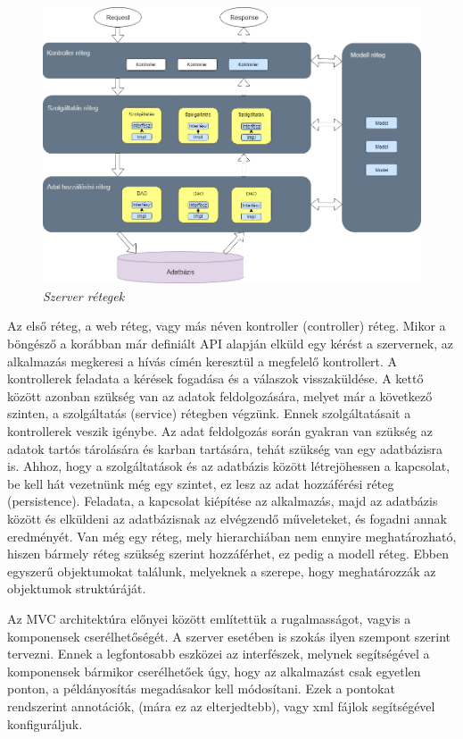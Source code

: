 \begin{figure}[!h]
	\centering
	\includegraphics[width=0.9\linewidth]{kepek/server-layers-colored.png}
	\caption{\textit{Szerver rétegek}}
	\label{fig:server-layers}
\end{figure}

Az első réteg, a web réteg, vagy más néven kontroller (controller) réteg. Mikor a böngésző a korábban már definiált API alapján elküld egy kérést a szervernek, az alkalmazás megkeresi a hívás címén keresztül a megfelelő kontrollert. A kontrollerek feladata a kérések fogadása és a válaszok visszaküldése.  A kettő között azonban szükség van az adatok feldolgozására, melyet már a következő szinten, a szolgáltatás (service) rétegben végzünk. Ennek szolgáltatásait a kontrollerek veszik igénybe. Az adat feldolgozás során gyakran van szükség az adatok tartós tárolására és karban tartására, tehát szükség van egy adatbázisra is. Ahhoz, hogy a szolgáltatások és az adatbázis között létrejöhessen a kapcsolat, be kell hát vezetnünk még egy szintet, ez lesz az adat hozzáférési réteg (persistence). Feladata, a kapcsolat kiépítése az alkalmazás, majd az adatbázis között és elküldeni az adatbázisnak az elvégzendő műveleteket, és fogadni annak eredményét. Van még egy réteg, mely hierarchiában nem ennyire meghatározható, hiszen bármely réteg szükség szerint hozzáférhet, ez pedig a modell réteg. Ebben egyszerű objektumokat találunk, melyeknek a szerepe, hogy meghatározzák az objektumok struktúráját.

Az MVC architektúra előnyei között említettük a rugalmasságot, vagyis a komponensek cserélhetőségét. A szerver esetében is szokás ilyen szempont szerint tervezni. Ennek a legfontosabb eszközei az interfészek, melynek segítségével a komponensek bármikor cserélhetőek úgy, hogy az alkalmazást csak egyetlen ponton, a példányosítás megadásakor kell módosítani. Ezek a pontokat rendszerint annotációk, (mára ez az elterjedtebb), vagy xml fájlok segítségével konfiguráljuk.

